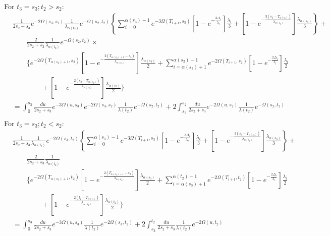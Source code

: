 \documentclass{article}
\begin{document}
For $t_3=s_3;t_2>s_2$:
\begin{align*}
    &\frac{1}{2s_2+s_3}e^{-2\Omega(s_3,s_2)}\frac{1}{\lambda_{\alpha(t_2)}}e^{-\Omega(s_2,t_2)}
    \left\{\sum_{i=0}^{\alpha(s_3)-1}e^{-3\Omega(T_{i+1},s_3)}
        \left[1-e^{-\frac{3\Delta_i}{\lambda_i}}\right]\frac{\lambda_i}{3}+
    \left[1-e^{-\frac{3\left(s_3-T_{\alpha(s_3)}\right)}{\lambda_{\alpha(s_3)}}}\right]
        \frac{\lambda_{\alpha(s_3)}}{3}\right\}+\\
    &\qquad\frac{2}{2s_2+s_3}\frac{1}{\lambda_{\alpha(t_2)}}e^{-\Omega(s_2,t_2)}\times\\
    &\qquad\Bigg\{e^{-2\Omega(T_{\alpha(s_3)+1},s_2)}\left[1-e^{-\frac{2\left(T_{\alpha(s_3)+1}-s_3\right)}{\lambda_{\alpha(s_3)}}}\right]\frac{\lambda_{\alpha(s_3)}}{2}+\sum_{i=\alpha(s_3)+1}^{\alpha(s_2)-1}e^{-2\Omega\left(T_{i+1},s_2\right)}\left[1-e^{-\frac{2\Delta_i}{\lambda_i}}\right]\frac{\lambda_i}{2}\\
    &\qquad\qquad+\left[1-e^{-\frac{2\left(s_2-T_{\alpha(s_2)}\right)}{\lambda_{\alpha(s_2)}}}\right]\frac{\lambda_{\alpha(s_2)}}{2}
    \Bigg\}
    \\
    &=\int_0^{s_3}\frac{du}{2s_2+s_3}e^{-3\Omega(u,s_3)}e^{-2\Omega(s_3,s_2)}\frac{1}{\lambda(t_2)}e^{-\Omega(s_2,t_2)}+
    2\int_{s_3}^{s_2}\frac{du}{2s_2+s_3}e^{-2\Omega(u,s_2)}\frac{1}{\lambda(t_2)}e^{-\Omega(s_2,t_2)}\\
\end{align*}
For $t_3=s_3; t_2<s_2$:
\begin{align*}
    &\frac{1}{2s_2+s_3}\frac{1}{\lambda_{\alpha(t_2)}}e^{-2\Omega(s_3,t_2)}
    \left\{\sum_{i=0}^{\alpha(s_3)-1}e^{-3\Omega(T_{i+1},s_3)}
        \left[1-e^{-\frac{3\Delta_i}{\lambda_i}}\right]\frac{\lambda_i}{3}+
    \left[1-e^{-\frac{3\left(s_3-T_{\alpha(s_3)}\right)}{\lambda_{\alpha(s_3)}}}\right]
        \frac{\lambda_{\alpha(s_3)}}{3}\right\}+\\
        &\qquad\frac{2}{2s_2+s_3}\frac{1}{\lambda_{\alpha(t_2)}}\\
    &\qquad\Bigg\{e^{-2\Omega(T_{\alpha(s_3)+1},t_2)}\left[1-e^{-\frac{2\left(T_{\alpha(s_3)+1}-s_3\right)}{\lambda_{\alpha(s_3)}}}\right]\frac{\lambda_{\alpha(s_3)}}{2}+\sum_{i=\alpha(s_3)+1}^{\alpha(t_2)-1}e^{-2\Omega\left(T_{i+1},t_2\right)}\left[1-e^{-\frac{2\Delta_i}{\lambda_i}}\right]\frac{\lambda_i}{2}\\
    &\qquad\qquad+\left[1-e^{-\frac{2\left(t_2-T_{\alpha(t_2)}\right)}{\lambda_{\alpha(t_2)}}}\right]\frac{\lambda_{\alpha(t_2)}}{2}
    \Bigg\}\\
    &=\int_0^{s_3}\frac{du}{2s_2+s_3}e^{-3\Omega(u,s_3)}\frac{1}{\lambda(t_2)}e^{-2\Omega(s_3,t_2)}+
    2\int_{s_3}^{t_2}\frac{du}{2s_2+s_3}\frac{1}{\lambda(t_2)}e^{-2\Omega(u,t_2)}\\
\end{align*}
\end{document}
